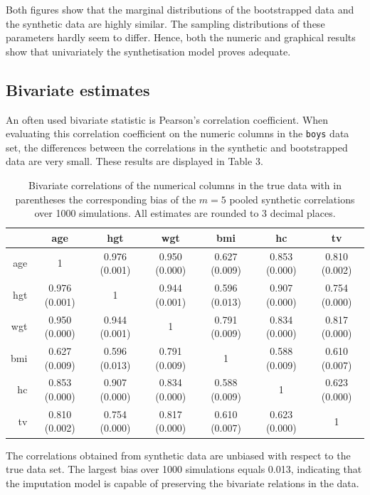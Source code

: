 \documentclass[psych,article,submit,moreauthors,pdftex]{mdpi}
\begin{document}
Both figures show that the marginal distributions of the bootstrapped
data and the synthetic data are highly similar. The sampling
distributions of these parameters hardly seem to differ. Hence, both the
numeric and graphical results show that univariately the synthetisation
model proves adequate.

\hypertarget{bivariate-estimates}{%
\subsection{Bivariate estimates}\label{bivariate-estimates}}

An often used bivariate statistic is Pearson's correlation coefficient.
When evaluating this correlation coefficient on the numeric columns in
the \texttt{boys} data set, the differences between the correlations in
the synthetic and bootstrapped data are very small. These results are
displayed in Table 3.

\begin{table}[H]
\caption{Bivariate correlations of the numerical columns in the true data with in parentheses the corresponding bias of the $m=5$ pooled synthetic correlations over 1000 simulations. All estimates are rounded to 3 decimal places. }
\centering
\begin{tabular}{rcccccc}
  \hline
 & age & hgt & wgt & bmi & hc & tv \\ 
  \hline
age & 1 & 0.976 (0.001) & 0.950 (0.000) & 0.627 (0.009) & 0.853 (0.000) & 0.810 (0.002) \\ 
  hgt & 0.976 (0.001) & 1 & 0.944 (0.001) & 0.596 (0.013) & 0.907 (0.000) & 0.754 (0.000) \\ 
  wgt & 0.950 (0.000) & 0.944 (0.001) & 1 & 0.791 (0.009) & 0.834 (0.000) & 0.817 (0.000) \\ 
  bmi & 0.627 (0.009) & 0.596 (0.013) & 0.791 (0.009) & 1 & 0.588 (0.009) & 0.610 (0.007) \\ 
  hc & 0.853 (0.000) & 0.907 (0.000) & 0.834 (0.000) & 0.588 (0.009) & 1 & 0.623 (0.000) \\ 
  tv & 0.810 (0.002) & 0.754 (0.000) & 0.817 (0.000) & 0.610 (0.007) & 0.623 (0.000) & 1 \\ 
   \hline
\end{tabular}
\end{table}

The correlations obtained from synthetic data are unbiased with respect
to the true data set. The largest bias over 1000 simulations equals
0.013, indicating that the imputation model is capable of preserving the
bivariate relations in the data.
\end{document}
